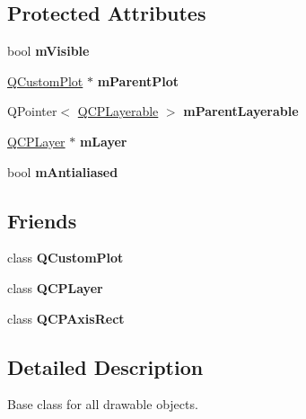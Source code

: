 \subsection*{Protected Attributes}
\begin{DoxyCompactItemize}
\item 
\mbox{\label{classQCPLayerable_a62e3aed8427d6ce3ccf716f285106cb3}} 
bool {\bfseries m\+Visible}
\item 
\mbox{\label{classQCPLayerable_aa2a528433e44db02b8aef23c1f9f90ed}} 
\hyperlink{classQCustomPlot}{Q\+Custom\+Plot} $\ast$ {\bfseries m\+Parent\+Plot}
\item 
\mbox{\label{classQCPLayerable_a3291445a980053e2d17a21d15957624e}} 
Q\+Pointer$<$ \hyperlink{classQCPLayerable}{Q\+C\+P\+Layerable} $>$ {\bfseries m\+Parent\+Layerable}
\item 
\mbox{\label{classQCPLayerable_aa38ec5891aff0f50b36fd63e9372a0cd}} 
\hyperlink{classQCPLayer}{Q\+C\+P\+Layer} $\ast$ {\bfseries m\+Layer}
\item 
\mbox{\label{classQCPLayerable_a3ab45a4c76a3333ce42eb217a81733ec}} 
bool {\bfseries m\+Antialiased}
\end{DoxyCompactItemize}
\subsection*{Friends}
\begin{DoxyCompactItemize}
\item 
\mbox{\label{classQCPLayerable_a1cdf9df76adcfae45261690aa0ca2198}} 
class {\bfseries Q\+Custom\+Plot}
\item 
\mbox{\label{classQCPLayerable_a5dbf96bf7664c1b6fce49063eeea6eef}} 
class {\bfseries Q\+C\+P\+Layer}
\item 
\mbox{\label{classQCPLayerable_acbf20ecb140f66c5fd1bc64ae0762990}} 
class {\bfseries Q\+C\+P\+Axis\+Rect}
\end{DoxyCompactItemize}


\subsection{Detailed Description}
Base class for all drawable objects. 

